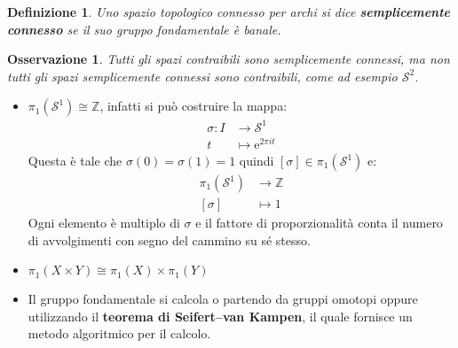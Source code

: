 \documentclass[10pt, twoside=false, x11names]{scrbook}
\newtheorem{osservation}[theorem]{Osservazione}
\newtheorem{definition}[theorem]{Definizione}
\newcommand{\Z}{\mathbb{Z}}
\newcommand{\me}{\mathrm{e}}
\newcommand{\Sph}[1][]{\mathcal{S}^#1}
\begin{document}
\begin{definition}
  Uno spazio topologico connesso per archi si dice \textbf{semplicemente connesso}
  se il suo gruppo fondamentale è banale.
\end{definition}

\begin{osservation}
  Tutti gli spazi contraibili sono semplicemente connessi, ma
  non tutti gli spazi semplicemente connessi sono contraibili, come ad esempio $ \Sph{2} $.
\end{osservation}

\begin{itemize}
\item $ \pi_1(\Sph{1}) \cong \Z $, infatti si può costruire la mappa:
  \begin{align*}
    \sigma \colon I & \to \Sph{1} \\
    t & \mapsto  \me^{2 \pi i t}
  \end{align*}
  Questa è tale che $ \sigma(0) = \sigma(1) = 1 $ quindi $ [\sigma] \in \pi_1(\Sph{1}) $ e:
  \begin{align*}
     \pi_1(\Sph{1}) & \to \Z \\
    [\sigma] & \mapsto  1
  \end{align*}
  Ogni elemento è multiplo di $ \sigma $ e il fattore di proporzionalità conta il numero di avvolgimenti
  con segno del cammino su sé stesso.
\item $ \pi_1(X \times Y) \cong \pi_1(X) \times \pi_1(Y) $
\item Il gruppo fondamentale si calcola o partendo da gruppi omotopi oppure utilizzando il \textbf{teorema di Seifert–van Kampen}, 
  il quale fornisce un metodo algoritmico per il calcolo.
\end{itemize}
\end{document}
